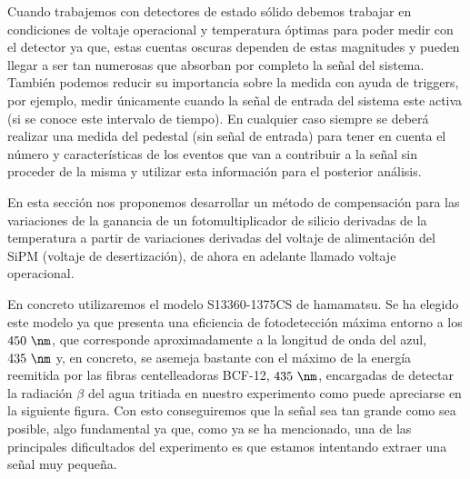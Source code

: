Cuando trabajemos con detectores de estado sólido debemos trabajar en condiciones de voltaje operacional y temperatura óptimas para poder medir con el detector ya  que, estas cuentas oscuras dependen de estas magnitudes y pueden llegar a ser tan numerosas que absorban por completo la señal del sistema. También podemos reducir su importancia sobre la medida con ayuda de triggers, por ejemplo, medir únicamente cuando la señal de entrada del sistema este activa (si se conoce este intervalo de tiempo). En cualquier caso siempre se deberá realizar una medida del pedestal (sin señal de entrada) para tener en cuenta el número y características de los eventos que van a contribuir a la señal sin proceder de la misma y utilizar esta información para el posterior análisis. 

En esta sección nos proponemos desarrollar un método de compensación para las variaciones de la ganancia de un fotomultiplicador de silicio derivadas de la temperatura a partir de variaciones derivadas del voltaje de alimentación del SiPM (voltaje de desertización), de ahora en adelante llamado voltaje operacional. 

En concreto utilizaremos el modelo S13360-1375CS de hamamatsu. Se ha elegido este modelo ya que presenta una eficiencia de fotodetección máxima entorno a los $450~\nm$, que corresponde aproximadamente a la longitud de onda del azul, $435~\nm$ y, en concreto, se asemeja bastante con el máximo de la energía reemitida por las fibras centelleadoras BCF-12, $435~\nm$, encargadas de detectar la radiación $\beta$ del agua tritiada en nuestro experimento como puede apreciarse en la siguiente figura. Con esto conseguiremos que la señal sea tan grande como sea posible, algo fundamental ya que, como ya se ha mencionado, una de las principales dificultados del experimento es que estamos intentando extraer una señal muy pequeña.

